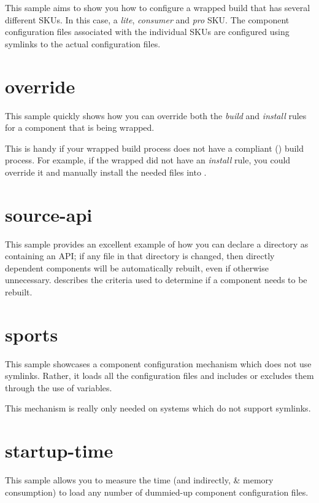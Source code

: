 This sample aims to show you how to configure a wrapped build that has
several different SKUs.  In this case, a \emph{lite}, \emph{consumer}
and \emph{pro} SKU.  The component configuration files associated with
the individual SKUs are configured using symlinks to the actual
configuration files.

\section{override}

This sample quickly shows how you can override both the \emph{build}
and \emph{install} rules for a component that is being wrapped.

This is handy if your wrapped build process does not have a compliant
() build process.  For example, if the
wrapped \makefile did not have an \emph{install} rule, you could
override it and manually install the needed files into \destdir.

\section{source-api}

This sample provides an excellent example of how you can declare a
directory as containing an API; if any file in that directory is
changed, then directly dependent components will be automatically
rebuilt, even if otherwise unnecessary.
 describes the criteria used to
determine if a component needs to be rebuilt.

\section{sports}

This sample showcases a component configuration mechanism which does
not use symlinks.  Rather, it loads all the configuration files and
includes or excludes them through the use of \make variables.

This mechanism is really only needed on systems which do not support
symlinks.

\section{startup-time}\label{samples:startup-time}

This sample allows you to measure the time (and indirectly, \lmsbw \&
\make memory consumption) to load any number of dummied-up component
configuration files.

